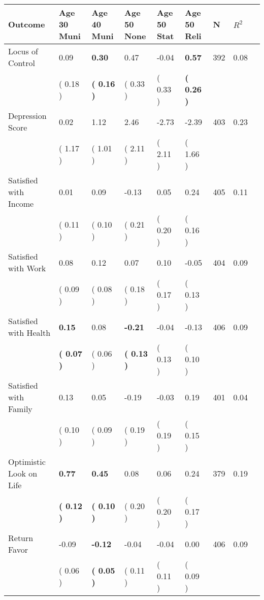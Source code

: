 \begin{tabular}{L{6.2cm} C{1.8cm} C{1.8cm} C{1.8cm} C{1.8cm} C{1.8cm} C{1.8cm} C{0.3cm} C{0.3cm}}
\toprule
 \textbf{Outcome} & \textbf{Age 30 Muni} & \textbf{Age 40 Muni} & \textbf{Age 50 None} & \textbf{Age 50 Stat} & \textbf{Age 50 Reli} & \textbf{N} & \textbf{$ R^2$} \\
\midrule
Locus of Control &      0.09 & \textbf{     0.30} &      0.47 &     -0.04 & \textbf{     0.57}  & 392 &       0.08 \\ 
 & (     0.18 ) & \textbf{(     0.16 )} & (     0.33 ) & (     0.33 ) & \textbf{(     0.26 )}  & \\
Depression Score &      0.02 &      1.12 &      2.46 &     -2.73 &     -2.39  & 403 &       0.23 \\ 
 & (     1.17 ) & (     1.01 ) & (     2.11 ) & (     2.11 ) & (     1.66 )  & \\
Satisfied with Income &      0.01 &      0.09 &     -0.13 &      0.05 &      0.24  & 405 &       0.11 \\ 
 & (     0.11 ) & (     0.10 ) & (     0.21 ) & (     0.20 ) & (     0.16 )  & \\
Satisfied with Work &      0.08 &      0.12 &      0.07 &      0.10 &     -0.05  & 404 &       0.09 \\ 
 & (     0.09 ) & (     0.08 ) & (     0.18 ) & (     0.17 ) & (     0.13 )  & \\
Satisfied with Health & \textbf{     0.15} &      0.08 & \textbf{    -0.21} &     -0.04 &     -0.13  & 406 &       0.09 \\ 
 & \textbf{(     0.07 )} & (     0.06 ) & \textbf{(     0.13 )} & (     0.13 ) & (     0.10 )  & \\
Satisfied with Family &      0.13 &      0.05 &     -0.19 &     -0.03 &      0.19  & 401 &       0.04 \\ 
 & (     0.10 ) & (     0.09 ) & (     0.19 ) & (     0.19 ) & (     0.15 )  & \\
Optimistic Look on Life & \textbf{     0.77} & \textbf{     0.45} &      0.08 &      0.06 &      0.24  & 379 &       0.19 \\ 
 & \textbf{(     0.12 )} & \textbf{(     0.10 )} & (     0.20 ) & (     0.20 ) & (     0.17 )  & \\
Return Favor &     -0.09 & \textbf{    -0.12} &     -0.04 &     -0.04 &      0.00  & 406 &       0.09 \\ 
 & (     0.06 ) & \textbf{(     0.05 )} & (     0.11 ) & (     0.11 ) & (     0.09 )  & \\

\end{tabular}
